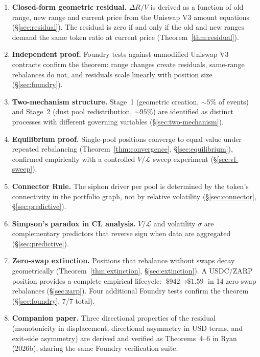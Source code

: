 \documentclass[11pt,a4paper]{article}
\begin{document}
\begin{enumerate}[leftmargin=*]
    \item \textbf{Closed-form geometric residual.} $\Delta R/V$ is derived as a function of old range, new range and current price from the Uniswap V3 amount equations (\S\ref{sec:residual}). The residual is zero if and only if the old and new ranges demand the same token ratio at current price (Theorem~\ref{thm:residual}).

    \item \textbf{Independent proof.} Foundry tests against unmodified Uniswap V3 contracts confirm the theorem: range changes create residuals, same-range rebalances do not, and residuals scale linearly with position size (\S\ref{sec:foundry}).

    \item \textbf{Two-mechanism structure.} Stage~1 (geometric creation, ${\sim}5\%$ of events) and Stage~2 (dust pool redistribution, ${\sim}95\%$) are identified as distinct processes with different governing variables (\S\ref{sec:two-mechanism}).

    \item \textbf{Equilibrium proof.} Single-pool positions converge to equal value under repeated rebalancing (Theorem~\ref{thm:convergence}, \S\ref{sec:equilibrium}), confirmed empirically with a controlled $V/\mathcal{L}$ sweep experiment (\S\ref{sec:vl-sweep}).

    \item \textbf{Connector Rule.} The siphon driver per pool is determined by the token's connectivity in the portfolio graph, not by relative volatility (\S\ref{sec:connector}, \S\ref{sec:predictive}).

    \item \textbf{Simpson's paradox in CL analysis.} $V/\mathcal{L}$ and volatility $\sigma$ are complementary predictors that reverse sign when data are aggregated (\S\ref{sec:predictive}).

    \item \textbf{Zero-swap extinction.} Positions that rebalance without swaps decay geometrically (Theorem~\ref{thm:extinction}, \S\ref{sec:extinction}). A USDC/ZARP position provides a complete empirical lifecycle: $\text{\$942} \to \text{\$1.59}$ in 14 zero-swap rebalances (\S\ref{sec:zarp}). Four additional Foundry tests confirm the theorem (\S\ref{sec:foundry}, 7/7 total).

    \item \textbf{Companion paper.} Three directional properties of the residual (monotonicity in displacement, directional asymmetry in USD terms, and exit-side asymmetry) are derived and verified as Theorems~4--6 in Ryan (2026b), sharing the same Foundry verification suite.
\end{enumerate}
\end{document}
